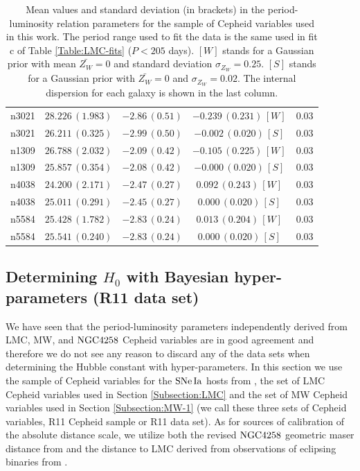 \begin{table}[tbp]
\begin{tabular}{@{}ccccc}
 n3021 & $28.226\,(1.983)$ & $-2.86\,(0.51)$ & $-0.239\,(0.231)\,[W]$ & $0.03$ \\

 n3021 & $26.211\,(0.325)$ & $-2.99\,(0.50)$ & $-0.002\,(0.020)\,[S]$ & $0.03$ \\
  
 n1309 & $26.788\,(2.032)$ & $-2.09\,(0.42)$ & $-0.105\,(0.225)\,[W]$ & $0.03$ \\

 n1309 & $25.857\,(0.354)$ & $-2.08\,(0.42)$ & $-0.000\,(0.020)\,[S]$ & $0.03$ \\
   
 n4038 & $24.200\,(2.171)$ & $-2.47\,(0.27)$ & $0.092\,(0.243)\,[W]$ & $0.03$ \\

 n4038 & $25.011\,(0.291)$ & $-2.45\,(0.27)$ & $0.000\,(0.020)\,[S]$ & $0.03$ \\
    
 n5584 & $25.428\,(1.782)$ & $-2.83\,(0.24)$ & $0.013\,(0.204)\,[W]$ & $0.03$ \\   

 n5584 & $25.541\,(0.240)$ & $-2.83\,(0.24)$ & $0.000\,(0.020)\,[S]$ & $0.03$ \\   
 
\hline
\end{tabular}
\caption{\label{Table:Zw-dependence-of-PL-relation} Mean values and standard deviation (in brackets) in the period-luminosity relation parameters for the sample of Cepheid variables used in this work. The period range used to fit the data is the same used in fit c of Table \ref{Table:LMC-fits} ($P<205$ days). $[W]$ stands for a Gaussian prior with mean  $\bar{Z_W}=0$ and standard deviation $\sigma_{Z_W}=0.25$. $[S]$ stands for a Gaussian prior with $\bar{Z_W}=0$ and $\sigma_{Z_W}=0.02$. The internal dispersion for each galaxy is shown in the last column.}
\end{table}

\subsection{Determining $H_0$ with Bayesian hyper-parameters (R11 data set)}
\label{Subsection:combining-anchors}

We have seen that the period-luminosity parameters independently derived from LMC, MW, and $\mathrm{NGC4258}$ Cepheid variables are in good agreement and therefore we do not see any reason to discard any of the data sets when determining the Hubble constant with hyper-parameters. In this section we use the sample of Cepheid variables for the $\mathrm{SNe\,Ia}$ hosts from \cite{Riess:2011yx}, the set of LMC Cepheid variables used in Section \ref{Subsection:LMC} and the set of MW Cepheid variables used in Section \ref{Subsection:MW-1} (we call these three sets of Cepheid variables, R11 Cepheid sample or R11 data set). As for sources of calibration of the absolute distance scale, we utilize both the revised $\mathrm{NGC4258}$ geometric maser distance from \cite{Humphreys:2013eja} and the distance to LMC derived from observations of eclipsing binaries from \cite{Pietrzynski:2013gia}.

